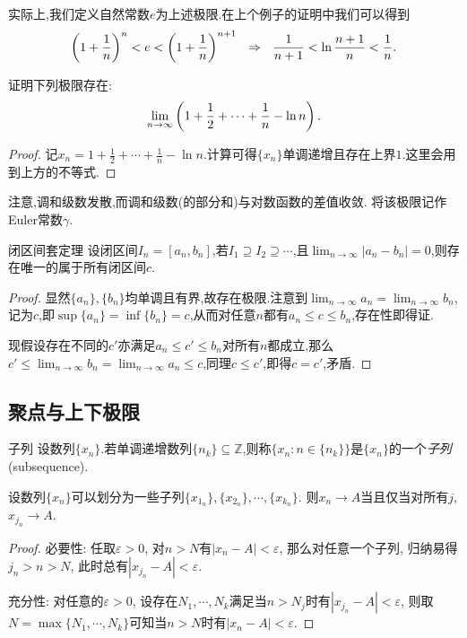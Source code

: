 实际上,我们定义自然常数$e$为上述极限.在上个例子的证明中我们可以得到$$\left( 1+\frac{1}{n} \right)^n < e < \left( 1+\frac{1}{n} \right)^{n+1} ~~\Rightarrow ~~ \frac{1}{n+1} < \ln \frac{n+1}{n} < \frac{1}{n}.$$

\begin{example}
	证明下列极限存在:$$\lim_{n\to \infty} \left(  1+\frac{1}{2}+\cdots + \frac{1}{n}-\ln n  \right).$$
\end{example}
\begin{proof}
	记$x_n=1+\frac{1}{2}+\cdots + \frac{1}{n}-\ln n$.计算可得$\{ x_n \}$单调递增且存在上界$1$.这里会用到上方的不等式.
\end{proof}

注意,调和级数发散,而调和级数(的部分和)与对数函数的差值收敛. 将该极限记作Euler常数$\gamma$.

\begin{theorem}{闭区间套定理}
	设闭区间$I_n=[a_n,b_n]$,若$I_1 \supseteq I_2 \supseteq \cdots $,且$\lim_{n\to \infty} |a_n-b_n|=0$,则存在唯一的属于所有闭区间$c$. 
\end{theorem}
\begin{proof}
	显然$\{ a_n \},\{ b_n \}$均单调且有界,故存在极限.注意到$\lim_{n\to \infty} a_n = \lim_{n\to \infty} b_n$,记为$c$,即$\sup \{ a_n \} = \inf \{ b_n \} = c$,从而对任意$n$都有$a_n \leq c \leq b_n$,存在性即得证.
	
	现假设存在不同的$c'$亦满足$a_n \leq c' \leq b_n$对所有$n$都成立,那么$c' \leq \lim_{n\to \infty} b_n = \lim_{n\to \infty} a_n \leq c$,同理$c \leq c'$,即得$c=c'$,矛盾.
\end{proof}

\subsection{聚点与上下极限}

\begin{definition}{子列}
	设数列$\{ x_n \}$.若单调递增数列$\{ n_k \} \subseteq \mathbb{Z}$,则称$\{ x_n:n \in  \{ n_k \} \}$是$\{ x_n \}$的一个\textit{子列}(subsequence).
\end{definition}

\begin{proposition}{}
	设数列$\{ x_n \}$可以划分为一些子列$\{ x_{1_n} \},\{ x_{2_n} \},\cdots ,\{ x_{k_n} \}$. 则$x_n \to A$当且仅当对所有$j$, $x_{j_n} \to A$. 
\end{proposition}
\begin{proof}
	必要性: 任取$\varepsilon >0$, 对$n>N$有$|x_n-A|<\varepsilon$, 那么对任意一个子列, 归纳易得$j_n>n>N$, 此时总有$|x_{j_n}-A|<\varepsilon$.
	
	充分性: 对任意的$\varepsilon >0$, 设存在$N_1,\cdots ,N_k$满足当$n>N_j$时有$|x_{j_n}-A|<\varepsilon$, 则取$N=\max \{ N_1,\cdots ,N_k \}$可知当$n>N$时有$|x_n-A|<\varepsilon$.
\end{proof}

